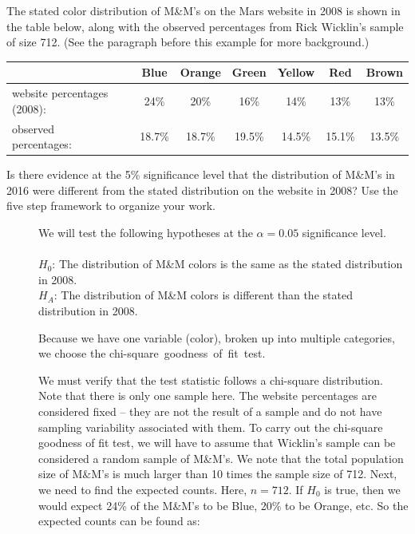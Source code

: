 \begin{examplewrap}
\begin{nexample}
{The stated color distribution of M\&M's on the Mars website in 2008 is shown in the table below, along with the observed percentages from Rick Wicklin's sample of size 712. (See the paragraph before this example for more background.) \\
\begin{center}
\begin{small}
\begin{tabular}{ll ccc ccc}
\hline
	 & \hspace{1mm} & Blue & Orange & Green & Yellow & Red & Brown\\
\hline
website percentages (2008):&		& 24\% & 20\% & 16\% & 14\% & 13\% & 13\%  \\
observed percentages:&		& 18.7\% & 18.7\% & 19.5\% & 14.5\% & 15.1\% & 13.5\%  \\
\hline
\end{tabular}
\end{small}
\end{center}


Is there evidence at the 5\% significance level that the distribution of M\&M's in 2016 were different from the stated distribution on the website in 2008? Use the five step framework to organize your work. }

\begin{description}
\item[]  
We will test the following hypotheses at the $\alpha=0.05$ significance level.\\
\\
$H_0$:  The distribution of M\&M colors is the same as the stated distribution in 2008. \\
$H_A$: The distribution of M\&M colors is different than the stated distribution in 2008.
 

\item[] Because we have one variable (color), broken up into multiple categories, we choose the \mbox{chi-square goodness of fit test.}
\item[]  We must verify that the test statistic follows a chi-square distribution.  Note that there is only one sample here.  The website percentages are considered fixed -- they are not the result of a sample and do not have sampling variability associated with them.  To carry out the chi-square goodness of fit test, we will have to assume that Wicklin's sample can be considered a random sample of M\&M's.  We note that the total population size of M\&M's is much larger than 10 times the sample size of 712.  Next, we need to find the expected counts.  Here, $n=712$.  If $H_0$ is true, then we would expect 24\% of the M\&M's to be Blue, 20\% to be Orange, etc.  So the expected counts can be found as:


\end{description}
\end{nexample}
\end{examplewrap}
